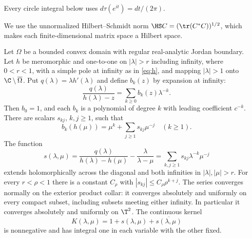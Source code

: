 

Every circle integral below uses $d\tau(e^{it})=dt/(2\pi)$.

We use the unnormalized Hilbert--Schmidt norm $\HS C=(\tr(C^*C))^{1/2}$, which makes each finite-dimensional matrix space a Hilbert space.

\begin{theorem}\label{lem:faber}
Let $\Omega$ be a bounded convex domain with regular real-analytic Jordan boundary. Let $h$ be meromorphic and one-to-one on $|\lambda|>r$ including infinity, where $0<r<1$, with a simple pole at infinity as in \eqref{eq:h}, and mapping $|\lambda|>1$ onto $\C\setminus\overline\Omega$. Put $q(\lambda)=\lambda h'(\lambda)$ and define $b_k(z)$ by expansion at infinity:
\begin{equation}\label{eq:faber}
 \frac{q(\lambda)}{h(\lambda)-z}=\sum_{k\ge0}b_k(z)\lambda^{-k}.
\end{equation}
Then $b_0=1$, and each $b_k$ is a polynomial of degree $k$ with leading coefficient $c^{-k}$. There are scalars $s_{kj}$, $k,j\ge1$, such that
\begin{equation}\label{eq:boundary-basis}
 b_k(h(\mu))=\mu^k+\sum_{j\ge1}s_{kj}\mu^{-j}\quad(k\ge1).
\end{equation}
The function
\begin{equation}\label{eq:s}
 s(\lambda,\mu)=\frac{q(\lambda)}{h(\lambda)-h(\mu)}-\frac{\lambda}{\lambda-\mu}
 =\sum_{k,j\ge1}s_{kj}\lambda^{-k}\mu^{-j}
\end{equation}
extends holomorphically across the diagonal and both infinities in $|\lambda|,|\mu|>r$. For every $r<\rho<1$ there is a constant $C_\rho$ with
$|s_{kj}|\le C_\rho\rho^{k+j}$. The series converges normally on
the exterior product collar: it converges absolutely and uniformly on
every compact subset, including subsets meeting either infinity.
In particular it converges absolutely and uniformly on $\T^2$. The continuous kernel
\[
 K(\lambda,\mu)=1+s(\lambda,\mu)+\overline{s(\lambda,\mu)}
\]
is nonnegative and has integral one in each variable with the other fixed.
\end{theorem}

